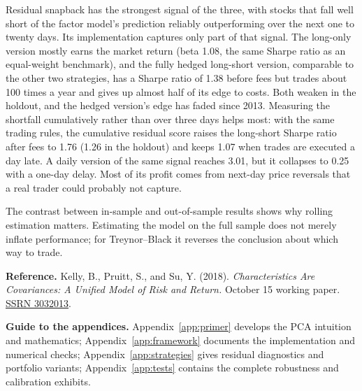\documentclass[11pt,letterpaper]{article}
\begin{document}
Residual snapback has the strongest signal of the three, with stocks that fall well short of
the factor model's prediction reliably outperforming over the next one to twenty days. Its
implementation captures only part of that signal. The long-only version mostly earns the
market return (beta 1.08, the same Sharpe ratio as an equal-weight benchmark), and the fully
hedged long-short version, comparable to the other two strategies, has a Sharpe ratio of
1.38 before fees but trades about 100 times a year and gives up almost half of its edge to
costs. Both weaken in the holdout, and the hedged version's edge has faded since 2013.
Measuring the shortfall cumulatively rather than over three days helps most: with the same
trading rules, the cumulative residual score raises the long-short Sharpe ratio after fees
to 1.76 (1.26 in the holdout) and keeps 1.07 when trades are executed a day late. A daily
version of the same signal reaches 3.01, but it collapses to 0.25 with a one-day delay. Most
of its profit comes from next-day price reversals that a real trader could probably not
capture.

The contrast between in-sample and out-of-sample results shows why rolling estimation
matters. Estimating the model on the full sample does not merely inflate performance; for
Treynor--Black it reverses the conclusion about which way to trade.

\begingroup\small
\noindent\textbf{Reference.}
Kelly, B., Pruitt, S., and Su, Y. (2018).
\emph{Characteristics Are Covariances: A Unified Model of Risk and Return.}
October 15 working paper. \href{https://ssrn.com/abstract=3032013}{SSRN 3032013}.
\par\endgroup

\clearpage


\appendix
{}
\noindent\textbf{Guide to the appendices.}
Appendix~\ref{app:primer} develops the PCA intuition and mathematics;
Appendix~\ref{app:framework} documents the implementation and numerical checks;
Appendix~\ref{app:strategies} gives residual diagnostics and portfolio variants;
Appendix~\ref{app:tests} contains the complete robustness and calibration exhibits.
\par\medskip

\end{document}
